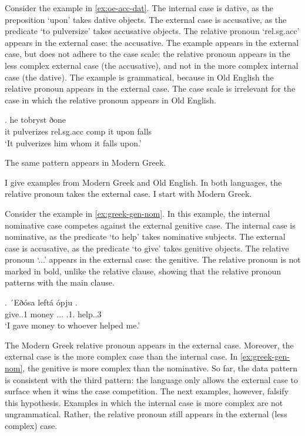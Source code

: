 Consider the example in \ref{ex:oe-acc-dat}.
The internal case is dative, as the preposition  `upon' takes dative objects.
The external case is accusative, as the predicate  `to pulversize' takes accusative objects.
The relative pronoun  `\ac{rel}.\ac{sg}.\ac{acc}' appears in the external case: the accusative.
The example appears in the external case, but does not adhere to the case scale: the relative pronoun appears in the less complex external  case (the accusative), and not in the more complex internal case (the dative).
The example is grammatical, because in Old English the relative pronoun appears in the external case. The case scale is irrelevant for the case in which the relative pronoun appears in Old English.

\exg. he tobryst ðone    \\
 it pulverizes\scsub{[acc]} \ac{rel}.\ac{sg}.\ac{acc} \ac{comp} it upon\scsub{[dat]} falls\\
`It pulverizes him whom it falls upon.'  \label{ex:oe-acc-dat}

The same pattern appears in Modern Greek.


I give examples from Modern Greek and Old English. In both languages, the relative pronoun takes the external case. I start with Modern Greek.

Consider the example in \ref{ex:greek-gen-nom}. In this example, the internal nominative case competes against the external genitive case.
The internal case is nominative, as the predicate  `to help' takes nominative subjects.
The external case is accusative, as the predicate  `to give' takes genitive objects.
The relative pronoun  `...' appears in the external case: the genitive. The relative pronoun is not marked in bold, unlike the relative clause, showing that the relative pronoun patterns with the main clause.

\exg. ´Eðósa leftá ópju  .\\
give..1 money ... .1. help..3\\
`I gave money to whoever helped me.' \label{ex:greek-gen-nom}

The Modern Greek relative pronoun appears in the external case. Moreover, the external case is the more complex case than the internal case. In \ref{ex:greek-gen-nom}, the genitive is more complex than the nominative.
So far, the data pattern is consistent with the third pattern: the language only allows the external case to surface when it wins the case competition. The next examples, however, falsify this hypothesis. Examples in which the internal case is more complex are not ungrammatical. Rather, the relative pronoun still appears in the external (less complex) case.




